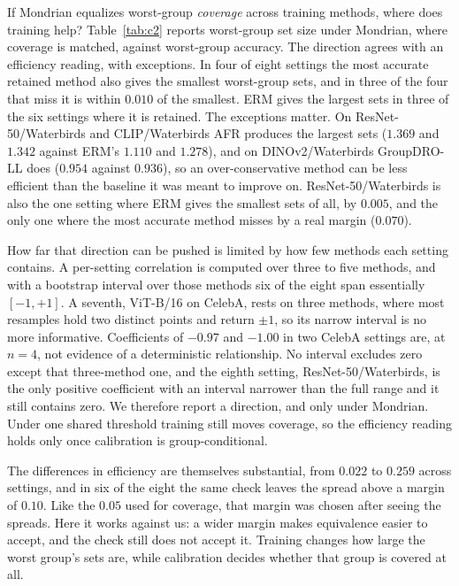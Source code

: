 \documentclass[pdflatex,sn-basic]{sn-jnl}%
\theoremstyle{thmstyleone}%
\begin{document}
If Mondrian equalizes worst-group \emph{coverage} across training methods, where does
training help? Table~\ref{tab:c2} reports worst-group set size under Mondrian, where coverage is
matched, against worst-group accuracy. The direction agrees with an efficiency reading, with
exceptions. In four of eight settings the most accurate retained method also gives the smallest
worst-group sets, and in three of the four that miss it is within $0.010$ of the smallest. ERM
gives the largest sets in three of the six settings where it is retained. The
exceptions matter. On ResNet-50/Waterbirds and CLIP/Waterbirds AFR produces the largest sets
($1.369$ and $1.342$ against ERM's $1.110$ and $1.278$), and on DINOv2/Waterbirds GroupDRO-LL does
($0.954$ against $0.936$), so an
over-conservative method can be less efficient than the baseline it was meant to improve on.
ResNet-50/Waterbirds is also the one setting where ERM gives the smallest sets of all, by $0.005$,
and the only one where the most accurate method misses by a real margin ($0.070$).

How far that direction can be pushed is limited by how few methods each setting contains.
A per-setting correlation is computed over three to five methods, and with a bootstrap interval
over those methods six of the eight span essentially $[-1,+1]$. A seventh, ViT-B/16 on CelebA,
rests on three methods, where most resamples hold two distinct points and return $\pm1$, so its
narrow interval is no more informative. Coefficients of $-0.97$ and $-1.00$ in two CelebA settings
are, at $n=4$, not evidence of a deterministic relationship. No interval excludes zero except that
three-method one, and the eighth setting, ResNet-50/Waterbirds, is the only positive coefficient
with an interval narrower than the full range and it still contains zero. We therefore report a direction, and only under Mondrian.
Under one shared threshold training still moves coverage, so the efficiency reading holds only once
calibration is group-conditional.

The differences in efficiency are themselves substantial, from $0.022$ to $0.259$ across
settings, and in six of the eight the same check leaves the spread above a margin of $0.10$. Like
the $0.05$ used for coverage, that margin was chosen after seeing the spreads. Here it works against
us: a wider margin makes equivalence easier to accept, and the check still does not accept it. Training changes how large the worst group's sets are,
while calibration decides whether that group is covered at all.
\end{document}

